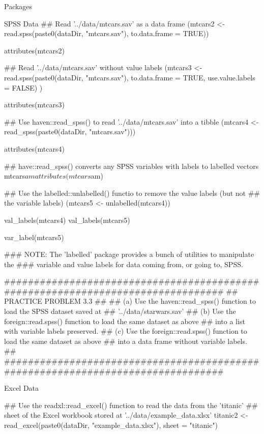 \documentclass[10pt]{beamer}
\begin{document}
\begin{frame}{Packages}
\begin{frame}[fragile]{SPSS Data}
## Read '../data/mtcars.sav' as a data frame
(mtcars2 <- read.spss(paste0(dataDir, "mtcars.sav"), to.data.frame = TRUE))

attributes(mtcars2)

## Read '../data/mtcars.sav' without value labels
(mtcars3 <- read.spss(paste0(dataDir, "mtcars.sav"),
                      to.data.frame = TRUE,
                      use.value.labels = FALSE)
)

attributes(mtcars3)

## Use haven::read_spss() to read '../data/mtcars.sav' into a tibble
(mtcars4 <- read_spss(paste0(dataDir, "mtcars.sav")))

attributes(mtcars4)

## have::read_spss() converts any SPSS variables with labels to labelled vectors
mtcars$am
attributes(mtcars$am)

## Use the labelled::unlabelled() functio to remove the value labels (but not
## the variable labels)
(mtcars5 <- unlabelled(mtcars4))

val_labels(mtcars4)
val_labels(mtcars5)

var_label(mtcars5)

### NOTE: The 'labelled' package provides a bunch of utilities to manipulate the
###       variable and value labels for data coming from, or going to, SPSS.

################################################################################
## PRACTICE PROBLEM 3.3
##
## (a) Use the haven::read_spss() function to load the SPSS dataset saved at
##     '../data/starwars.sav'
## (b) Use the foreign::read.spss() function to load the same dataset as above
##     into a list with variable labels preserved.
## (c) Use the foreign::read.spss() function to load the same dataset as above
##     into a data frame without variable labels.
##
################################################################################

\end{frame}


\begin{frame}[fragile]{Excel Data}

## Use the readxl::read_excel() function to read the data from the 'titanic'
## sheet of the Excel workbook stored at '../data/example_data.xlsx'
titanic2 <- read_excel(paste0(dataDir, "example_data.xlsx"), sheet = "titanic")


\end{frame}
\end{frame}
\end{document}
